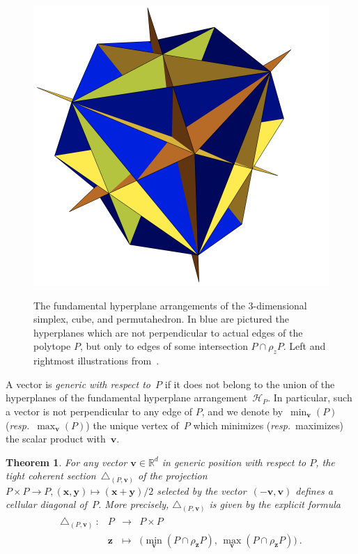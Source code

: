 \documentclass{amsart}
\newcommand{\darkblue}{\color{darkblue}} %
\newtheorem{theorem}{Theorem}[section]
\theoremstyle{definition}
\newcommand{\R}{\mathbb{R}} %
\renewcommand{\b}[1]{{\boldsymbol{#1}}} %
\newcommand{\resp}{\textit{resp.}~} %
\newcommand{\defn}[1]{\textsl{\darkblue #1}} %
\renewcommand{\b}[1]{\boldsymbol{#1}} %
\begin{document}
\begin{figure}[p]
{		\includegraphics[scale=.3]{HypPermuto.png}
	}
	\caption{The fundamental hyperplane arrangements of the $3$-dimensional simplex, cube, and permutahedron. In blue are pictured the hyperplanes which are not perpendicular to actual edges of the polytope $P$, but only to edges of some intersection $P\cap \rho_z P$. Left and rightmost illustrations from~\cite[Fig.~12]{LaplanteAnfossi}.}
	\label{fig:examplesHyperplanes}
\end{figure}

A vector is \defn{generic with respect to~$P$} if it does not belong to the union of the hyperplanes of the fundamental hyperplane arrangement~$\mathcal{H}_P$.
In particular, such a vector is not perpendicular to any edge of $P$, and we denote by~$\min_{\b{v}}(P)$ (\resp $\max_{\b{v}}(P)$) the unique vertex of~$P$ which minimizes (\resp maximizes) the scalar product with~$\b{v}$. 

\begin{theorem}
\label{thm:diagonal}
For any vector $\b{v} \in \R^d$ in generic position with respect to $P$, the tight coherent section~$\triangle_{(P,\b{v})}$ of the projection $P \times P \to P, (\b{x}, \b{y}) \mapsto (\b{x}+\b{y})/2$ selected by the vector~$(-\b{v}, \b{v})$ defines a cellular diagonal of~$P$.
More precisely, $\triangle_{(P,\b{v})}$ is given by the explicit formula
\begin{align*}
	\begin{array}{rlcl}
		\triangle_{(P,\b{v})}\ : & P & \to & P\times P \\
		& \b{z} & \mapsto & \bigl( \min_{\b{v}}(P\cap \rho_{\b{z}} P), \, \max_{\b{v}}(P\cap \rho_{\b{z}} P) \bigr) \ .
	\end{array}
\end{align*}
\end{theorem}
\end{document}

